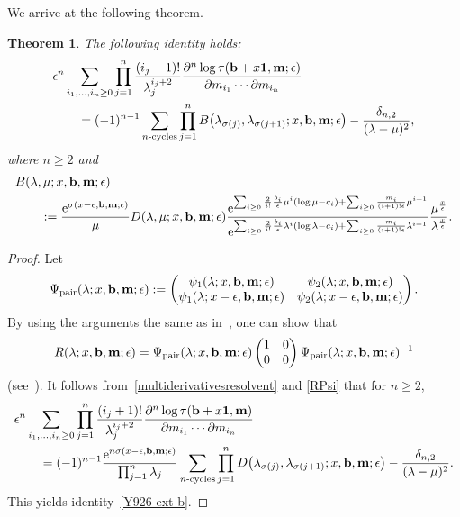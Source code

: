 \documentclass[11pt]{article}
\numberwithin{equation}{section}
\newcommand{\e}{\epsilon}
\newcommand{\p}{\partial}
\newcommand{\nn}{\nonumber}
\newcommand{\beq}{\begin{equation}}
\newcommand{\eeq}{\end{equation}}
\numberwithin{equation}{section}
\newtheorem{Theorem}{Theorem}[section]
\begin{document}
We arrive at the following theorem.
\begin{Theorem} The following identity holds:
\begin{align}
& \e^n \sum_{i_1,\dots,i_n\ge0}
\prod_{j=1}^n \frac{(i_j+1)!}{\lambda_j^{i_j+2}} \frac{\p^n \log \tau({\bf b}+x{\bf 1},{\bf m}; \e)}{\p m_{i_1} \cdots \p m_{i_n}}
\nn\\
&\qquad{}= (-1)^{n-1}
\sum_{\text{$n$-cycles}}
\prod_{j=1}^n B\bigl(\lambda_{\sigma(j)},\lambda_{\sigma(j+1)}; x, {\bf b}, {\bf m};\e\bigr) - \frac{\delta_{n,2}}{(\lambda-\mu)^2},\label{Y926-ext-b}
\end{align}
where $n\ge2$ and
\begin{align*}%
&B(\lambda,\mu;x, {\bf b},{\bf m};\e)\\
&\qquad{} := \frac{{\rm e}^{\sigma(x-\e, {\bf b},{\bf m};\e)}}{\mu} D(\lambda,\mu; x, {\bf b}, {\bf m};\e)
\frac
{{\rm e}^{\sum_{i\ge0} \frac2{i!} \frac{b_i}\e \mu^i (\log \mu-c_i)+\sum_{i\ge0} \frac{m_i}{(i+1)!\e} \mu^{i+1}}}
{{\rm e}^{\sum_{i\ge0} \frac2{i!} \frac{b_i}\e \lambda^{i} (\log \lambda-c_i)+\sum_{i\ge0} \frac{m_i}{(i+1)!\e} \lambda^{i+1}}}\frac{\mu^{\frac{x}\e}}{\lambda^{\frac{x}\e}}. \nn
\end{align*}
\end{Theorem}
\begin{proof}
Let
\[
\Psi_{\rm pair}(\lambda; x, {\bf b}, {\bf m};\e) :=
\begin{pmatrix} \psi_1(\lambda; x, {\bf b}, {\bf m};\e) & \psi_2(\lambda; x, {\bf b}, {\bf m};\e)
\\
\psi_1(\lambda; x-\e, {\bf b}, {\bf m};\e) & \psi_2(\lambda; x-\e, {\bf b}, {\bf m};\e)
\end{pmatrix} .
\]
By using the arguments the same as in~\cite{Y}, one can show that
\beq\label{RPsi}
R(\lambda; x, {\bf b}, {\bf m};\e) = \Psi_{\rm pair}(\lambda; x, {\bf b}, {\bf m};\e) \begin{pmatrix} 1 & 0 \\ 0 & 0\end{pmatrix}
\Psi_{\rm pair}(\lambda; x, {\bf b}, {\bf m};\e)^{-1}
\eeq
(see~\cite[the proof of Proposition~3]{Y}).
It follows from~\eqref{multiderivativesresolvent} and \eqref{RPsi} that for $n\ge2$,
\begin{align*}%
&\e^n\sum_{i_1,\dots,i_n\ge0} \prod_{j=1}^n \frac{(i_j+1)!}{\lambda_j^{i_j+2}}
\frac{\p^n \log \tau({\bf b}+x{\bf 1},{\bf m})}{\p m_{i_1} \cdots \p m_{i_n}} \\
&\qquad{}= (-1)^{n-1}
\frac{{\rm e}^{n \sigma(x-\e,{\bf b}, {\bf m};\e)}}{\prod_{j=1}^n \lambda_j} \sum_{\text{$n$-cycles}}
\prod_{j=1}^n D\bigl(\lambda_{\sigma(j)},\lambda_{\sigma(j+1)}; x, {\bf b}, {\bf m};\e\bigr) - \frac{\delta_{n,2}}{(\lambda-\mu)^2}. \nn
\end{align*}
This yields identity~\eqref{Y926-ext-b}.
\end{proof}
\end{document}
